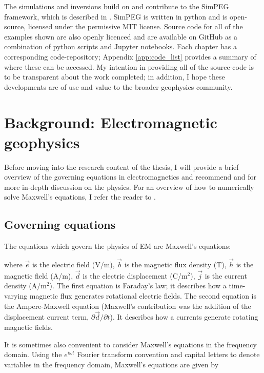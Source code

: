 The simulations and inversions build on and contribute to the SimPEG framework, which is described in \cite{Cockett2015, Heagy2017, Cockett2017}. SimPEG is written in python and is open-source, licensed under the permissive MIT license. Source code for all of the examples shown are also openly licenced and are available on GitHub as a combination of python scripts and Jupyter notebooks. Each chapter has a corresponding code-repository; Appendix \ref{app:code_list} provides a summary of where these can be accessed. My intention in providing all of the source-code is to be transparent about the work completed; in addition, I hope these developments are of use and value to the broader geophysics community.
\section{Background: Electromagnetic geophysics}
\label{sec:background-em}
Before moving into the research content of the thesis, I will provide a brief overview of the governing equations in electromagnetics and recommend \cite{Ward1988} and \cite{emgeosci} for more in-depth discussion on the physics. For an overview of how to numerically solve Maxwell's equations, I refer the reader to \cite{Haber2014}.
\subsection{Governing equations}
The equations which govern the physics of EM are Maxwell’s equations:

where $\vec{e}$ is the electric field (V/m), $\vec{b}$ is the magnetic flux density (T), $\vec{h}$ is the magnetic field (A/m), $\vec{d}$ is the electric displacement (C/m$^2$), $\vec{j}$ is the current density (A/m$^2$). The first equation is Faraday’s law; it describes how a time-varying magnetic flux generates rotational electric fields. The second equation is the Ampere-Maxwell equation (Maxwell's contribution was the addition of the displacement current term, $\partial \vec{d} / \partial t$). It describes how a currents generate rotating magnetic fields.

It is sometimes also convenient to consider Maxwell’s equations in the frequency domain. Using the $e^{i\omega t}$ Fourier transform convention and capital letters to denote variables in the frequency domain, Maxwell’s equations are given by


